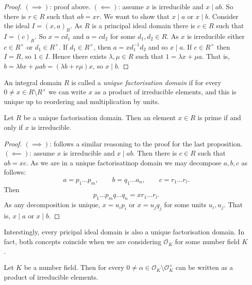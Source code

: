 \begin{proof}
	$(\implies)$: proof above.
	$(\impliedby)$: assume $x$ is irreducible and $x \mid ab$.
	So there is $r \in R$ such that $ab = xr$.
	We want to show that $x \mid a$ or $x \mid b$.
	Consider the ideal $I = (x,a)_R$.
	As $R$ is a principal ideal domain there is $c \in R$
	such that $I = (c)_R$.
	So $x = cd_1$ and $a = c d_2$ for some $d_1, d_2 \in R$.
	As $x$ is irreducible either $c \in R^\times$ or $d_1 \in R^\times$.
	If $d_1 \in R^\times$, then $a = x d_1^{-1} d_2$ and so $x \mid a$.
	If $c \in R^\times$ then $I = R$, so $1 \in I$.
	Hence there exists $\lambda, \mu \in R$ such that
	$1 = \lambda x + \mu a$.
	That is, $b = \lambda bx + \mu ab = (\lambda b + r \mu)x$,
	so $x \mid b$.
\end{proof}

\begin{definition}
	An integral domain $R$ is called a \emph{unique factorisation domain}
	if for every $0 \neq x \in R \setminus R^\times$ we can write $x$ as a
	product of irreducible elements, and this is unique up to reordering and
	multiplication by units.
\end{definition}

\begin{proposition}[]
	Let $R$ be a unique factorisation domain.
	Then an element $x \in R$ is prime if and only if $x$ is irreducible.
\end{proposition}

\begin{proof}
	$(\implies)$: follows a similar reasoning to the proof for the last
	proposition.
	$(\impliedby)$: assume $x$ is irreducible and $x \mid ab$.
	Then there is $c \in R$ such that $ab = xc$.
	As we are in a unique factorisatinop domain we may decompose $a,b,c$
	as follows:
	\[
		a = p_1 \ldots p_m, \qquad
		b = q_1 \ldots a_n, \qquad
		c = r_1 \ldots r_l.
	\]
	Then
	\[
		p_1 \ldots p_m q \ldots q_n = x r_1 \ldots r_l.
	\]
	As any decomposition is unique, $x = u_i p_i$ or $x = u_j q_j$
	for some units $u_i, u_j$.
	That is, $x \mid a$ or $x \mid b$.
\end{proof}

Interstingly, every pricipal ideal domain is also a unique factorisation domain.
In fact, both concepts coincide when we are considering $\mathcal O_K$ for some
number field $K$.

\begin{theorem}[]
	Let $K$ be a number field.
	Then for every 
	$0 \neq \alpha \in \mathcal O_K \setminus \mathcal O_K^\times$
	can be written as a product of irreducible elements.
\end{theorem}


